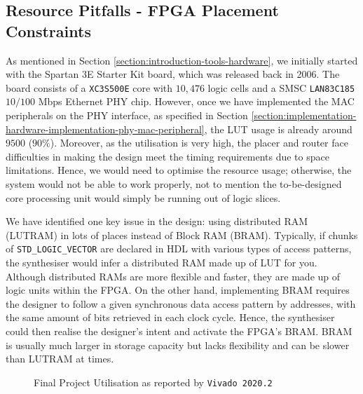 \documentclass[a4paper]{report}
\newcommand{\code}{\texttt}
\begin{document}
\subsection{Resource Pitfalls - FPGA Placement Constraints}

As mentioned in Section \ref{section:introduction-tools-hardware}, we initially started with the Spartan 3E Starter Kit board, which was released back in 2006. The board consists of a \code{XC3S500E} core with $10,476$ logic cells \cite{xilinx-documentation-2011-core} and a SMSC \code{LAN83C185} $10/100$ Mbps Ethernet PHY chip. However, once we have implemented the MAC peripherals on the PHY interface, as specified in Section \ref{section:implementation-hardware-implementation-phy-mac-peripheral}, the LUT usage is already around $9500$ ($90\%$). Moreover, as the utilisation is very high, the placer and router face difficulties in making the design meet the timing requirements due to space limitations. Hence, we would need to optimise the resource usage; otherwise, the system would not be able to work properly, not to mention the to-be-designed core processing unit would simply be running out of logic slices. 

We have identified one key issue in the design: using distributed RAM (LUTRAM) in lots of places instead of Block RAM (BRAM). Typically, if chunks of \code{STD\_LOGIC\_VECTOR} are declared in HDL with various types of access patterns, the synthesiser would infer a distributed RAM made up of LUT for you. Although distributed RAMs are more flexible and faster, they are made up of logic units within the FPGA. On the other hand, implementing BRAM requires the designer to follow a given synchronous data access pattern by addresses, with the same amount of bits retrieved in each clock cycle. Hence, the synthesiser could then realise the designer's intent and activate the FPGA's BRAM. BRAM is usually much larger in storage capacity but lacks flexibility and can be slower than LUTRAM at times. 

\begin{figure}[h!]
  \caption{Final Project Utilisation as reported by \code{Vivado 2020.2}}
  \label{fig:utilisation-fpga}
\end{figure}
\end{document}
